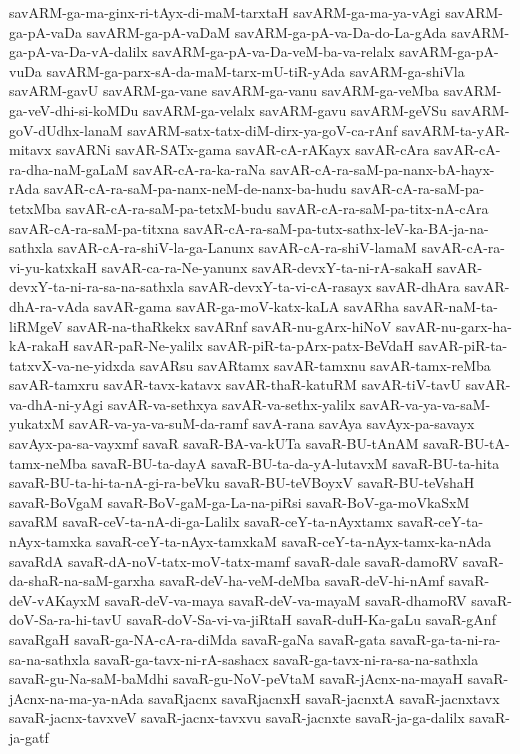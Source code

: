 {savARM-ga-ma-ginx-ri-tAyx-di-maM-tarxtaH
savARM-ga-ma-ya-vAgi
savARM-ga-pA-vaDa
savARM-ga-pA-vaDaM
savARM-ga-pA-va-Da-do-La-gAda
savARM-ga-pA-va-Da-vA-dalilx
savARM-ga-pA-va-Da-veM-ba-va-relalx
savARM-ga-pA-vuDa
savARM-ga-parx-sA-da-maM-tarx-mU-tiR-yAda
savARM-ga-shiVla
savARM-gavU
savARM-ga-vane
savARM-ga-vanu
savARM-ga-veMba
savARM-ga-veV-dhi-si-koMDu
savARM-ga-velalx
savARM-gavu
savARM-geVSu
savARM-goV-dUdhx-lanaM
savARM-satx-tatx-diM-dirx-ya-goV-ca-rAnf
savARM-ta-yAR-mitavx
savARNi
savAR-SATx-gama
savAR-cA-rAKayx
savAR-cAra
savAR-cA-ra-dha-naM-gaLaM
savAR-cA-ra-ka-raNa
savAR-cA-ra-saM-pa-nanx-bA-hayx-rAda
savAR-cA-ra-saM-pa-nanx-neM-de-nanx-ba-hudu
savAR-cA-ra-saM-pa-tetxMba
savAR-cA-ra-saM-pa-tetxM-budu
savAR-cA-ra-saM-pa-titx-nA-cAra
savAR-cA-ra-saM-pa-titxna
savAR-cA-ra-saM-pa-tutx-sathx-leV-ka-BA-ja-na-sathxla
savAR-cA-ra-shiV-la-ga-Lanunx
savAR-cA-ra-shiV-lamaM
savAR-cA-ra-vi-yu-katxkaH
savAR-ca-ra-Ne-yanunx
savAR-devxY-ta-ni-rA-sakaH
savAR-devxY-ta-ni-ra-sa-na-sathxla
savAR-devxY-ta-vi-cA-rasayx
savAR-dhAra
savAR-dhA-ra-vAda
savAR-gama
savAR-ga-moV-katx-kaLA
savARha
savAR-naM-ta-liRMgeV
savAR-na-thaRkekx
savARnf
savAR-nu-gArx-hiNoV
savAR-nu-garx-ha-kA-rakaH
savAR-paR-Ne-yalilx
savAR-piR-ta-pArx-patx-BeVdaH
savAR-piR-ta-tatxvX-va-ne-yidxda
savARsu
savARtamx
savAR-tamxnu
savAR-tamx-reMba
savAR-tamxru
savAR-tavx-katavx
savAR-thaR-katuRM
savAR-tiV-tavU
savAR-va-dhA-ni-yAgi
savAR-va-sethxya
savAR-va-sethx-yalilx
savAR-va-ya-va-saM-yukatxM
savAR-va-ya-va-suM-da-ramf
savA-rana
savAya
savAyx-pa-savayx
savAyx-pa-sa-vayxmf
savaR
savaR-BA-va-kUTa
savaR-BU-tAnAM
savaR-BU-tA-tamx-neMba
savaR-BU-ta-dayA
savaR-BU-ta-da-yA-lutavxM
savaR-BU-ta-hita
savaR-BU-ta-hi-ta-nA-gi-ra-beVku
savaR-BU-teVBoyxV
savaR-BU-teVshaH
savaR-BoVgaM
savaR-BoV-gaM-ga-La-na-piRsi
savaR-BoV-ga-moVkaSxM
savaRM
savaR-ceV-ta-nA-di-ga-Lalilx
savaR-ceY-ta-nAyxtamx
savaR-ceY-ta-nAyx-tamxka
savaR-ceY-ta-nAyx-tamxkaM
savaR-ceY-ta-nAyx-tamx-ka-nAda
savaRdA
savaR-dA-noV-tatx-moV-tatx-mamf
savaR-dale
savaR-damoRV
savaR-da-shaR-na-saM-garxha
savaR-deV-ha-veM-deMba
savaR-deV-hi-nAmf
savaR-deV-vAKayxM
savaR-deV-va-maya
savaR-deV-va-mayaM
savaR-dhamoRV
savaR-doV-Sa-ra-hi-tavU
savaR-doV-Sa-vi-va-jiRtaH
savaR-duH-Ka-gaLu
savaR-gAnf
savaRgaH
savaR-ga-NA-cA-ra-diMda
savaR-gaNa
savaR-gata
savaR-ga-ta-ni-ra-sa-na-sathxla
savaR-ga-tavx-ni-rA-sashacx
savaR-ga-tavx-ni-ra-sa-na-sathxla
savaR-gu-Na-saM-baMdhi
savaR-gu-NoV-peVtaM
savaR-jAcnx-na-mayaH
savaR-jAcnx-na-ma-ya-nAda
savaRjacnx
savaRjacnxH
savaR-jacnxtA
savaR-jacnxtavx
savaR-jacnx-tavxveV
savaR-jacnx-tavxvu
savaR-jacnxte
savaR-ja-ga-dalilx
savaR-ja-gatf
}

